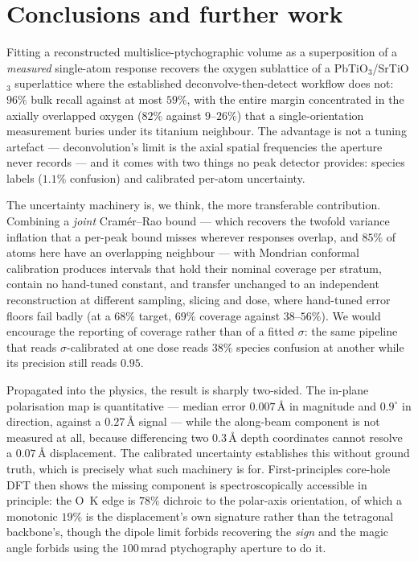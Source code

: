 \documentclass[aps,prb,twocolumn,superscriptaddress,floatfix,nofootinbib]{revtex4-2}
\begin{document}
\section{Conclusions and further work}

Fitting a reconstructed multislice-ptychographic volume as a superposition of a \emph{measured}
single-atom response recovers the oxygen sublattice of a PbTiO$_3$/SrTiO$_3$ superlattice where
the established deconvolve-then-detect workflow does not: $96\%$ bulk recall against at most
$59\%$, with the entire margin concentrated in the axially overlapped oxygen ($82\%$ against
$9$--$26\%$) that a single-orientation measurement buries under its titanium neighbour. The
advantage is not a tuning artefact --- deconvolution's limit is the axial spatial frequencies
the aperture never records --- and it comes with two things no peak detector provides: species
labels ($1.1\%$ confusion) and calibrated per-atom uncertainty.

The uncertainty machinery is, we think, the more transferable contribution. Combining a
\emph{joint} Cram\'er--Rao bound --- which recovers the twofold variance inflation that a
per-peak bound misses wherever responses overlap, and $85\%$ of atoms here have an overlapping
neighbour --- with Mondrian conformal calibration produces intervals that hold their nominal
coverage per stratum, contain no hand-tuned constant, and transfer unchanged to an independent
reconstruction at different sampling, slicing and dose, where hand-tuned error floors fail
badly (at a $68\%$ target, $69\%$ coverage against $38$--$56\%$). We would encourage the reporting of coverage rather than
of a fitted $\sigma$: the same pipeline that reads $\sigma$-calibrated at one dose reads
$38\%$ species confusion at another while its precision still reads $0.95$.

Propagated into the physics, the result is sharply two-sided. The in-plane polarisation map is
quantitative --- median error $0.007$\,\AA{} in magnitude and $0.9^\circ$ in direction, against
a $0.27$\,\AA{} signal --- while the along-beam component is not measured at all, because
differencing two $0.3$\,\AA{} depth coordinates cannot resolve a $0.07$\,\AA{} displacement.
The calibrated uncertainty establishes this without ground truth, which is precisely what such
machinery is for. First-principles core-hole DFT then shows the missing component is
spectroscopically accessible in principle: the O~K edge is $78\%$ dichroic to the polar-axis
orientation, of which a monotonic $19\%$ is the displacement's own signature rather than the
tetragonal backbone's, though the dipole limit forbids recovering the \emph{sign} and the magic
angle forbids using the $100$\,mrad ptychography aperture to do it.
\end{document}
